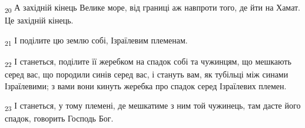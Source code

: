 \begin{tcolorbox}
\textsubscript{20} А західній кінець Велике море, від границі аж навпроти того, де йти на Хамат. Це західній кінець.
\end{tcolorbox}
\begin{tcolorbox}
\textsubscript{21} І поділите цю землю собі, Ізраїлевим племенам.
\end{tcolorbox}
\begin{tcolorbox}
\textsubscript{22} І станеться, поділите її жеребком на спадок собі та чужинцям, що мешкають серед вас, що породили синів серед вас, і стануть вам, як тубільці між синами Ізраїлевими; з вами вони кинуть жеребка про спадок серед Ізраїлевих племен.
\end{tcolorbox}
\begin{tcolorbox}
\textsubscript{23} І станеться, у тому племені, де мешкатиме з ним той чужинець, там дасте його спадок, говорить Господь Бог.
\end{tcolorbox}
